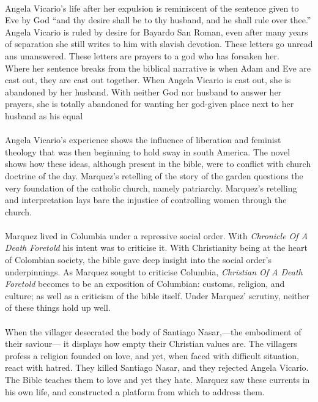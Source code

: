 \documentclass[11pt,a4wide]{article}
\begin{document}
\paragraph{} Angela Vicario's life after her expulsion is reminiscent of the 
sentence given to Eve by God ``and thy desire shall be to thy husband, and he 
shall rule over thee.\cite[Genesis 3:16]{bible}'' Angela Vicario is ruled by 
desire for Bayardo San Roman, even after many years of separation she still 
writes to him with slavish devotion. These letters go unread ans unanswered. 
These letters are prayers to a god who has forsaken her.\\
Where her sentence breaks from the biblical narrative is when Adam and Eve
are cast out, they are cast out together. When Angela Vicario is cast out, she 
is abandoned by her husband. With neither God nor husband to answer her prayers,
she is totally abandoned for wanting her god-given place next to her husband as
his equal

\paragraph{} Angela Vicario's experience shows the influence of liberation and feminist 
theology that was then beginning to hold sway in south America. \cite{lib-theo} The novel
shows how these ideas, although present in the bible, were to conflict
with church doctrine of the day. Marquez's retelling of the story of the garden
questions the very foundation of the catholic church, namely patriarchy.
Marquez's retelling and interpretation lays bare the injustice of controlling
women through the church.

\paragraph{} Marquez lived in Columbia under a repressive social order.
With \emph{Chronicle Of A Death Foretold} his intent was to criticise it. 
With Christianity being at the heart of Colombian society, the bible gave deep insight
into the social order's underpinnings.
As Marquez sought to criticise Columbia, \emph{Christian Of A Death Foretold}
becomes to be an exposition of Columbian: customs, religion, and culture;
as well as a criticism of the bible itself.
Under Marquez' scrutiny, neither of these things hold up well.
\paragraph{} When the villager desecrated the body of Santiago Nasar,---the embodiment of their saviour---
it displays how empty their Christian values are.
The villagers profess a religion founded on love,
and yet, when faced with difficult situation, react with hatred. They killed Santiago Nasar,
and they rejected Angela Vicario. The Bible teaches them to love
and yet they hate.
Marquez saw these currents in his own life, and constructed a platform from which to address them.
\end{document}
